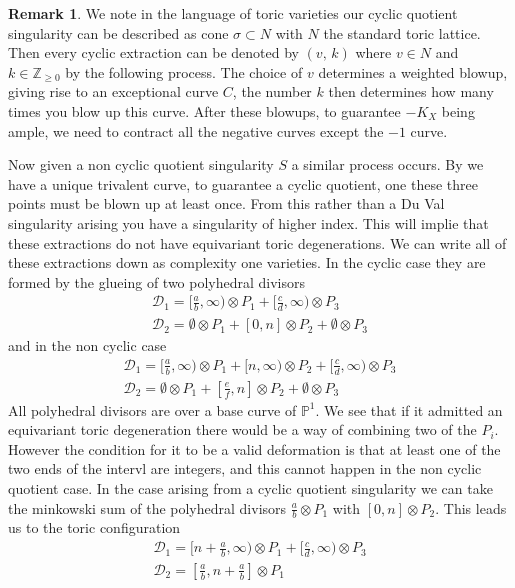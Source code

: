 \documentclass[11pt]{amsart}
\theoremstyle{definition}
\theoremstyle{definition}
\theoremstyle{definition}
\theoremstyle{definition}
\theoremstyle{definition}
\theoremstyle{definition}
\theoremstyle{definition}
\theoremstyle{definition}
\newtheorem*{rem}{Remark}
\begin{document}
\begin{rem}
We note in the language of toric varieties our cyclic quotient singularity can be described as cone $\sigma \subset N$ with $N$ the standard toric lattice. Then every cyclic extraction can be denoted by $(v, \, k)$ where $v \in N$ and $k \in \mathbb{Z}_{\geq 0}$ by the following process. The choice of $v$ determines a weighted blowup, giving rise to an exceptional curve $C$, the number $k$ then determines how many times you blow up this curve. After these blowups, to guarantee $-K_X$ being ample, we need to contract all the negative curves except the $-1$ curve.
\end{rem}

Now given a non cyclic quotient singularity $S$ a similar process occurs. By \cite{Br} we have a unique trivalent curve, to guarantee a cyclic quotient, one these three points must be blown up at least once. From this rather than a Du Val singularity arising you have a singularity of higher index. This will implie that these extractions do not have equivariant toric degenerations. We can write all of these extractions down as complexity one varieties. In the cyclic case they are formed by the glueing of two polyhedral divisors 
\[
\begin{array}{l}
\mathcal{D}_1 = [\frac{a}{b}, \infty) \otimes P_1 + [\frac{c}{d}, \infty) \otimes P_3 \\
\mathcal{D}_2 =  \emptyset \otimes P_1 + [0, n] \otimes P_2 + \emptyset \otimes P_3
\end{array}
\]
and in the non cyclic case 
\[
\begin{array}{l}
\mathcal{D}_1 = [\frac{a}{b}, \infty) \otimes P_1 + [n, \infty) \otimes P_2 + [\frac{c}{d}, \infty) \otimes P_3 \\
\mathcal{D}_2 =  \emptyset \otimes P_1 + [\frac{e}{f}, n] \otimes P_2 + \emptyset \otimes P_3
\end{array}
\]
All polyhedral divisors are over a base curve of $\mathbb{P}^1$. We see that if it admitted an equivariant toric degeneration there would be a way of combining two of the $P_i$. However the condition for it to be a valid deformation is that at least one of the two ends of the intervl are integers, and this cannot happen in the non cyclic quotient case. In the case arising from a cyclic quotient singularity we can take the minkowski sum of the polyhedral divisors $\frac{a}{b} \otimes P_1$ with $[0, n] \otimes P_2$. This leads us to the toric configuration 
\[
\begin{array}{l}
\mathcal{D}_1 = [ n + \frac{a}{b}, \infty) \otimes P_1 + [\frac{c}{d}, \infty) \otimes P_3 \\
\mathcal{D}_2 =  [\frac{a}{b}, n + \frac{a}{b}] \otimes P_1
\end{array}
\]
\end{document}
